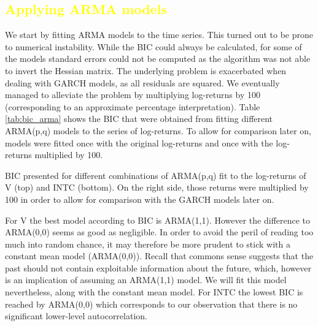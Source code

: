 \begin{figure}[h!]
    \centering
    \begin{adjustbox}{width=.95\textwidth,center}
    
    
    \end{adjustbox}
    \caption{}
    \label{fig:ljungbox}
\end{figure}{}

\subsection{\textcolor{yellow}{Applying ARMA models}}
We start by fitting ARMA models to the time series. This turned out to be prone to numerical instability. While the BIC could always be calculated, for some of the models standard errors could not be computed as the algorithm was not able to invert the Hessian matrix. The underlying problem is exacerbated when dealing with GARCH models, as all residuals are squared. We eventually managed to alleviate the problem by multiplying log-returns by 100 (corresponding to an approximate percentage interpretation). Table \ref{tab:bic_arma} shows the BIC that were obtained from fitting different ARMA(p,q) models to the series of log-returns. To allow for comparison later on, models were fitted once with the original log-returns and once with the log-returns multiplied by 100. 

\begin{table}[h!]
    \centering
    \small
    
    \caption{BIC presented for different combinations of ARMA(p,q) fit to the log-returns of V (top) and INTC (bottom). On the right side, those returns were multiplied by 100 in order to allow for comparison with the GARCH models later on.}
    \label{tab:bic_arma}
\end{table}{}

For V the best model according to BIC is ARMA(1,1). However the difference to ARMA(0,0) seems as good as negligible. In order to avoid the peril of reading too much into random chance, it may therefore be more prudent to stick with a constant mean model (ARMA(0,0)). Recall that commons sense suggests that the past should not contain exploitable information about the future, which, however is an implication of assuming an ARMA(1,1) model. We will fit this model nevertheless, along with the constant mean model. For INTC the lowest BIC is reached by ARMA(0,0) which corresponds to our observation that there is no significant lower-level autocorrelation. 

